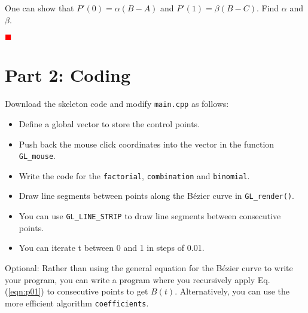 \documentclass[12pt]{article}
\newcounter{problem}
\newcounter{problempart}[problem]
\newcounter{solutionpart}[problem]
\newenvironment{problem}{\stepcounter{problem}\noindent{\bf\arabic{problem}.}}{\setcounter{problempart}{0}\setcounter{solutionpart}{0}}
\newenvironment{solution}{\par\textcolor{green!50!black}\bgroup}{\egroup\par}
\newcommand{\TODO}{\textcolor{red}{$\blacksquare$}}
\begin{document}
\begin{problem}
  One can show that $P'(0) = \alpha (B-A)$ and $P'(1) = \beta (B-C)$.  Find
  $\alpha$ and $\beta$.
\end{problem}

\begin{solution}
  \textbf{\textcolor{red}{\TODO}}
\end{solution}

\section*{Part 2: Coding}

Download the skeleton code and modify \texttt{main.cpp} as follows:
\begin{itemize}
\item Define a global vector to store the control points.
\item Push back the mouse click coordinates into the vector in the function
  \texttt{GL\_mouse}.
\item Write the code for the \texttt{factorial}, \texttt{combination} and \texttt{binomial}.
\item Draw line segments between points along the B\'ezier curve in \texttt{GL\_render()}.
\item You can use \texttt{GL\_LINE\_STRIP} to draw line segments between consecutive
  points.
\item You can iterate t between 0 and 1 in steps of 0.01.
\end{itemize}
Optional: Rather than using the general equation for the B\'ezier curve to write
your program, you can write a program where you recursively apply
Eq. (\ref{eqn:p01}) to consecutive points to get $B(t)$.  Alternatively, you can
use the more efficient algorithm \texttt{coefficients}.
\end{document}
